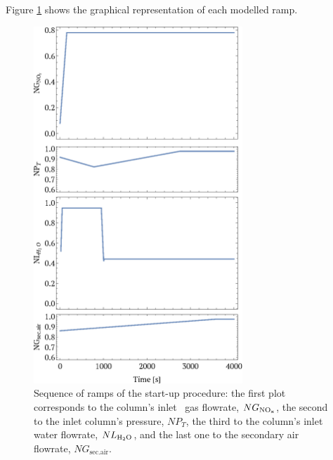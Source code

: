 \documentclass[journal=jacsat,manuscript=article]{achemso}
\newcommand{\nox}{\ce{NO_{\rmfamily{x}}}}
\newcommand{\hdoiso}{\ce{H2O}}
\begin{document}
Figure \ref{fig:modelall} shows the graphical representation of each modelled ramp. 


\begin{figure}[htb]
	\centering
	\includegraphics[width=0.7\textwidth]{figure2sp.eps}
	\caption[Sequence of ramps of the start-up procedure.]{Sequence of ramps of the start-up procedure: the first plot corresponds to the column's inlet \nox~gas flowrate, $NG_{\text{\nox}}$, the second to the inlet column's pressure, $NP_T$, the third to the column's inlet water flowrate, $NL_{\text{\hdoiso}}$, and the last one to the secondary air flowrate, $NG_{\text{sec.air}}$.} 
	\label{fig:modelall}
\end{figure}
\end{document}
